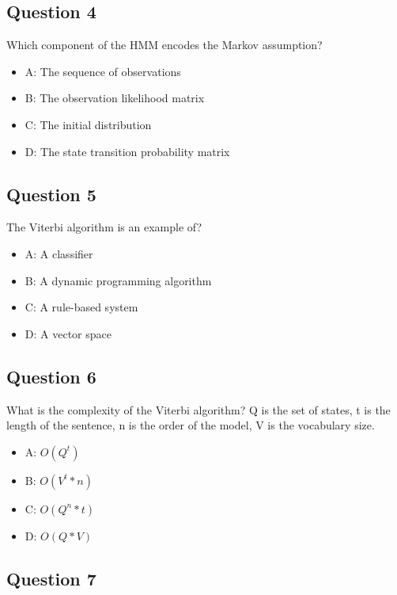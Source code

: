 \documentclass[
  11pt,
  british,
]{article}
\providecommand{\tightlist}{%
  \setlength{\itemsep}{0pt}\setlength{\parskip}{0pt}}
\begin{document}
\hypertarget{question-4-4}{%
\subsection{Question 4}\label{question-4-4}}

Which component of the HMM encodes the Markov assumption?

\begin{itemize}
\tightlist
\item
  A: The sequence of observations
\item
  B: The observation likelihood matrix
\item
  C: The initial distribution
\item
  D: The state transition probability matrix
\end{itemize}

\hypertarget{question-5-4}{%
\subsection{Question 5}\label{question-5-4}}

The Viterbi algorithm is an example of?

\begin{itemize}
\tightlist
\item
  A: A classifier
\item
  B: A dynamic programming algorithm
\item
  C: A rule-based system
\item
  D: A vector space
\end{itemize}

\hypertarget{question-6-4}{%
\subsection{Question 6}\label{question-6-4}}

What is the complexity of the Viterbi algorithm? Q is the set of states,
t is the length of the sentence, n is the order of the model, V is the
vocabulary size.

\begin{itemize}
\tightlist
\item
  A: \(O(Q^t)\)
\item
  B: \(O(V^t*n)\)
\item
  C: \(O(Q^n*t)\)
\item
  D: \(O(Q*V)\)
\end{itemize}

\hypertarget{question-7-1}{%
\subsection{Question 7}\label{question-7-1}}
\end{document}
